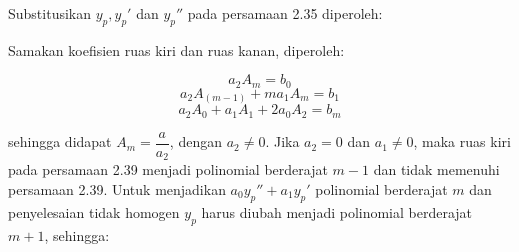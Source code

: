 \begin{enumerate}[1.]
	Substitusikan \begin{math} y_p, y_p' \end{math} dan \begin{math} y_p'' \end{math} pada persamaan 2.35 diperoleh:


	Samakan koefisien ruas kiri dan ruas kanan, diperoleh:

	\begin{displaymath} a_2 A_m = b_0 \end{displaymath}
	\begin{displaymath} a_2 A_(m - 1) + m a_1 A_m = b_1 \end{displaymath}
	\begin{displaymath} a_2 A_0 + a_1 A_1 + 2 a_0 A_2 = b_m \end{displaymath}

	sehingga didapat \begin{math} A_m = \dfrac{a}{a_2} \end{math}, dengan \begin{math} a_2 \neq 0 \end{math}. Jika \begin{math} a_2 = 0 \end{math} dan \begin{math} a_1 \neq 0 \end{math}, maka ruas kiri pada persamaan 2.39 menjadi polinomial berderajat
	\begin{math} m - 1 \end{math} dan tidak memenuhi persamaan 2.39. Untuk menjadikan \begin{math} a_0 y_p'' + a_1 y_p' \end{math} polinomial berderajat \begin{math} m \end{math} dan penyelesaian tidak homogen \begin{math} y_p \end{math} harus diubah	
	menjadi polinomial berderajat \begin{math} m + 1 \end{math}, sehingga:


\end{enumerate}
